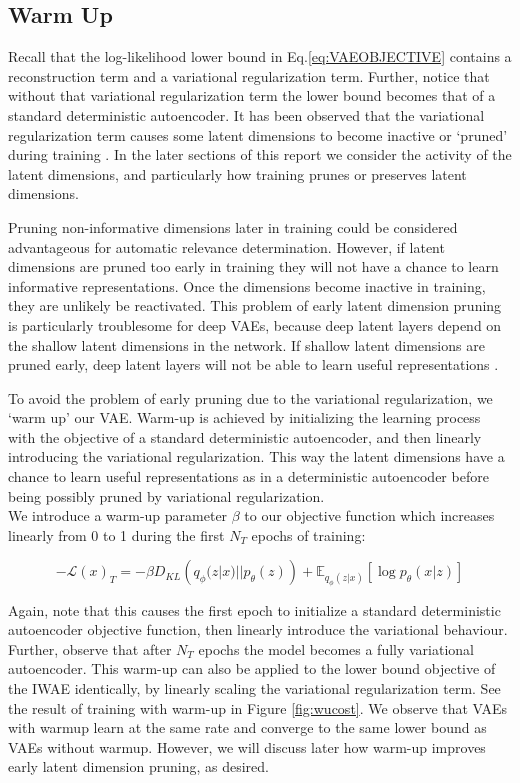 \documentclass{article} %
\numberwithin{figure}{section}
\renewcommand{\L}{\mathcal{L}}
\begin{document}
\subsection{Warm Up}
Recall that the log-likelihood lower bound in Eq.\ref{eq:VAEOBJECTIVE} contains a reconstruction term and a variational regularization term. Further, notice that without that variational regularization term the lower bound becomes that of a standard deterministic autoencoder. It has been observed that the variational regularization term causes some latent dimensions to become inactive or `pruned' during training \cite{MacKay2001, Burda2016}. In the later sections of this report we consider the activity of the latent dimensions, and particularly how training prunes or preserves latent dimensions.
\par Pruning non-informative dimensions later in training could be considered advantageous for automatic relevance determination. However, if latent dimensions are pruned too early in training they will not have a chance to learn informative representations. Once the dimensions become inactive in training, they are unlikely be reactivated. This problem of early latent dimension pruning is particularly troublesome for deep VAEs, because deep latent layers depend on the shallow latent dimensions in the network. If shallow latent dimensions are pruned early,  deep latent layers will not be able to learn useful representations \cite{Sonderby2016}.
\par To avoid the problem of early pruning due to the variational regularization, we `warm up' our VAE. Warm-up is achieved by initializing the learning process with the objective of a standard deterministic autoencoder, and then linearly introducing the variational regularization. This way the latent dimensions have a chance to learn useful representations as in a deterministic autoencoder before being possibly pruned by variational regularization.\\ We introduce a warm-up parameter $\beta$ to our objective function which increases linearly from 0 to 1 during the first $N_T$ epochs of training:

\begin{equation}
    -\L(x)_T=-\beta D_{KL}\left(q_\phi(z|x)||p_\theta(z)\right)+\mathbb{E}_{q_\phi(z|x)}\left[\log{p_\theta(x|z)}\right]
\end{equation}

Again, note that this causes the first epoch to initialize a standard deterministic autoencoder objective function, then linearly introduce the variational behaviour. Further, observe that after $N_T$ epochs the model becomes a fully variational autoencoder. This warm-up can also be applied to the lower bound objective of the IWAE identically, by linearly scaling the variational regularization term. See the result of training with warm-up in Figure \ref{fig:wucost}. We observe that VAEs with warmup learn at the same rate and converge to the same lower bound as VAEs without warmup. However, we will discuss later how warm-up improves early latent dimension pruning, as desired. 
\end{document}
